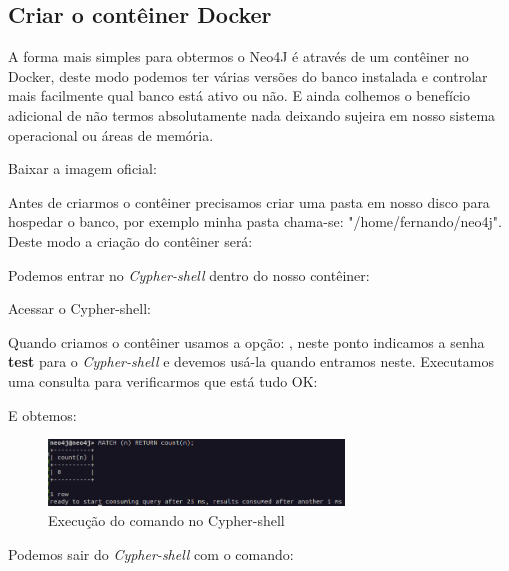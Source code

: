 \documentclass[a4paper,11pt]{article}
\begin{document}
\subsection{Criar o contêiner Docker}
A forma mais simples para obtermos o Neo4J é através de um contêiner no Docker, deste modo podemos ter várias versões do banco instalada e controlar mais facilmente qual banco está ativo ou não. E ainda colhemos o benefício adicional de não termos absolutamente nada deixando sujeira em nosso sistema operacional ou áreas de memória.

Baixar a imagem oficial: \\

Antes de criarmos o contêiner precisamos criar uma pasta em nosso disco para hospedar o banco, por exemplo minha pasta chama-se: "/home/fernando/neo4j". Deste modo a criação do contêiner será: \\

Podemos entrar no \textit{Cypher-shell} dentro do nosso contêiner: \\

Acessar o Cypher-shell: \\

Quando criamos o contêiner usamos a opção: , neste ponto indicamos a senha \textbf{test} para o \textit{Cypher-shell} e devemos usá-la quando entramos neste. Executamos uma consulta para verificarmos que está tudo OK: \\

E obtemos:
\begin{figure}[H]
	\centering
	\includegraphics[width=0.7\textwidth]{imagens/cyphershell}
	\caption{Execução do comando no Cypher-shell}
\end{figure}

Podemos sair do \textit{Cypher-shell} com o comando: \\
\end{document}
